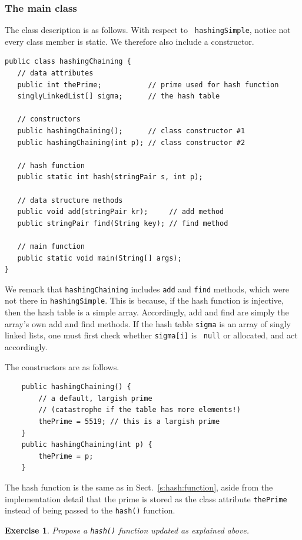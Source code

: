 \documentclass[a4paper]{book}
\theoremstyle{changebreak}                %
\newtheorem{ex}[result]{Exercise}
\begin{document}
\subsubsection{The main class}
The class description is as follows. With respect to {\tt
  hashingSimple}, notice not every class member is
static. We therefore also include a
constructor.
\begin{verbatim}
public class hashingChaining {
   // data attributes
   public int thePrime;           // prime used for hash function
   singlyLinkedList[] sigma;      // the hash table

   // constructors
   public hashingChaining();      // class constructor #1
   public hashingChaining(int p); // class constructor #2

   // hash function
   public static int hash(stringPair s, int p); 

   // data structure methods
   public void add(stringPair kr);     // add method
   public stringPair find(String key); // find method
   
   // main function
   public static void main(String[] args);
}
\end{verbatim}
We remark that {\tt hashingChaining} includes {\tt add} and {\tt find}
methods, which were not there in {\tt hashingSimple}. This is because,
if the hash function is injective, then the hash table is a simple
array. Accordingly, add and find are simply the array's own add and
find methods. If the hash table {\tt sigma} is an array of singly
linked lists, one must first check whether {\tt sigma[i]} is {\tt
  null} or allocated, and act accordingly. 

The constructors are as follows.
\begin{verbatim}
    public hashingChaining() { 
        // a default, largish prime
        // (catastrophe if the table has more elements!)
        thePrime = 5519; // this is a largish prime
    }
    public hashingChaining(int p) {
        thePrime = p;
    }
\end{verbatim}
The hash function is the same as in
Sect.~\ref{s:hash:function}, aside from the implementation detail that
the prime is stored as the class attribute {\tt thePrime} instead of
being passed to the {\tt hash()} function.
\begin{ex}
Propose a {\tt hash()} function updated as explained above.
\end{ex}
\end{document}
